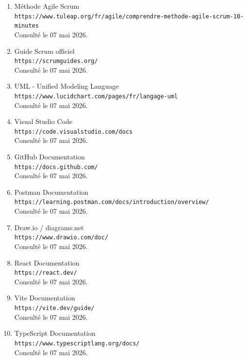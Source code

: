 \documentclass[12pt,a4paper]{report}
\begin{document}
\begin{enumerate}
    \item Méthode Agile Scrum \\
    \texttt{https://www.tuleap.org/fr/agile/comprendre-methode-agile-scrum-10-minutes} \\
    Consulté le 07 mai 2026.

    \item Guide Scrum officiel \\
    \texttt{https://scrumguides.org/} \\
    Consulté le 07 mai 2026.

    \item UML - Unified Modeling Language \\
    \texttt{https://www.lucidchart.com/pages/fr/langage-uml} \\
    Consulté le 07 mai 2026.

    \item Visual Studio Code \\
    \texttt{https://code.visualstudio.com/docs} \\
    Consulté le 07 mai 2026.

    \item GitHub Documentation \\
    \texttt{https://docs.github.com/} \\
    Consulté le 07 mai 2026.

    \item Postman Documentation \\
    \texttt{https://learning.postman.com/docs/introduction/overview/} \\
    Consulté le 07 mai 2026.

    \item Draw.io / diagrams.net \\
    \texttt{https://www.drawio.com/doc/} \\
    Consulté le 07 mai 2026.

    \item React Documentation \\
    \texttt{https://react.dev/} \\
    Consulté le 07 mai 2026.

    \item Vite Documentation \\
    \texttt{https://vite.dev/guide/} \\
    Consulté le 07 mai 2026.

    \item TypeScript Documentation \\
    \texttt{https://www.typescriptlang.org/docs/} \\
    Consulté le 07 mai 2026.


\end{enumerate}
\end{document}
